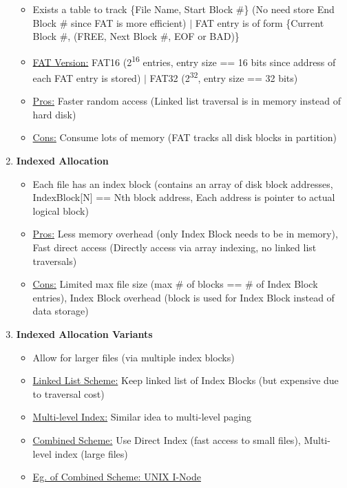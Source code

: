 \documentclass[landscape]{article}
\begin{document}
\begin{multicols*}{6}
\begin{enumerate}
\begin{itemize}
        \item Exists a table to track \{File Name, Start Block \#\} (No need store End Block \# since FAT is more efficient) $\vert$ FAT entry is of form \{Current Block \#, (FREE, Next Block \#, EOF or BAD)\}
        \item \underline{FAT Version:} FAT16 (2\textsuperscript{16} entries, entry size == 16 bits since address of each FAT entry is stored) $\vert$ FAT32 (2\textsuperscript{32}, entry size == 32 bits)
        \item \underline{Pros:} Faster random access (Linked list traversal is in memory instead of hard disk)
        \item \underline{Cons:} Consume lots of memory (FAT tracks all disk blocks in partition)
      \end{itemize}
      \item \textbf{Indexed Allocation}
      \begin{itemize}
        \item Each file has an index block (contains an array of disk block addresses, IndexBlock[N] == Nth block address, Each address is pointer to actual logical block)
        \item \underline{Pros:} Less memory overhead (only Index Block needs to be in memory), Fast direct access (Directly access via array indexing, no linked list traversals)
        \item \underline{Cons:} Limited max file size (max \# of blocks == \# of Index Block entries), Index Block overhead (block is used for Index Block instead of data storage)
      \end{itemize}
      \item \textbf{Indexed Allocation Variants}
      \begin{itemize}
        \item Allow for larger files (via multiple index blocks)
        \item \underline{Linked List Scheme:} Keep linked list of Index Blocks (but expensive due to traversal cost)
        \item \underline{Multi-level Index:} Similar idea to multi-level paging
        \item \underline{Combined Scheme:} Use Direct Index (fast access to small files), Multi-level index (large files)
        \item \underline{Eg. of Combined Scheme: UNIX I-Node}

\end{itemize}
\end{enumerate}
\end{multicols*}
\end{document}
